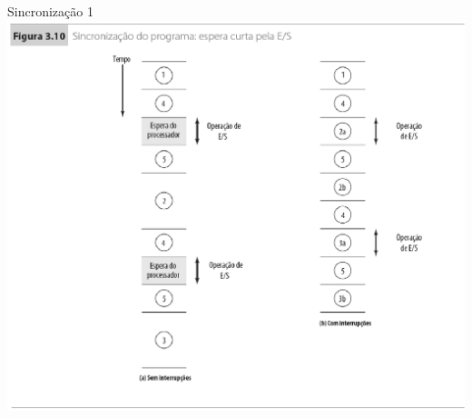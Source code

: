\begin{slide}{Sincronização 1}
   \includegraphics[height=0.8\textheight]{figs/sinc1.eps}
\end{slide}

